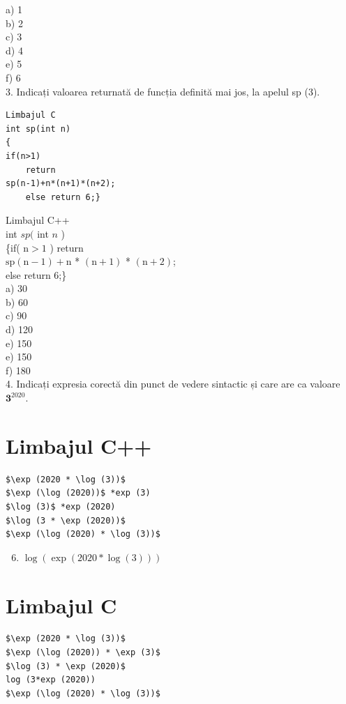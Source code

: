 \documentclass[10pt]{article}
\begin{document}
a) 1\\
b) 2\\
c) 3\\
d) 4\\
e) 5\\
f) 6\\
3. Indicați valoarea returnată de funcția definită mai jos, la apelul sp (3).

\begin{verbatim}
Limbajul C
int sp(int n)
{
if(n>1)
    return
sp(n-1)+n*(n+1)*(n+2);
    else return 6;}
\end{verbatim}

Limbajul C++\\
int $s p($ int $n$ )\\
\{if( $\mathrm{n}>1$ ) return\\
$\mathrm{sp}(\mathrm{n}-1)+\mathrm{n}$ * $(\mathrm{n}+1)$ * $(\mathrm{n}+2)$;\\
else return 6;\}\\
a) 30\\
b) 60\\
c) 90\\
d) 120\\
e) 150\\
e) 150\\
f) 180\\
4. Indicați expresia corectă din punct de vedere sintactic și care are ca valoare $\mathbf{3}^{2020}$.

\section*{Limbajul C++}
\begin{verbatim}
$\exp (2020 * \log (3))$
$\exp (\log (2020))$ *exp (3)
$\log (3)$ *exp (2020)
$\log (3 * \exp (2020))$
$\exp (\log (2020) * \log (3))$
\end{verbatim}

\begin{enumerate}
  \setcounter{enumi}{5}
  \item $\log (\exp (2020 * \log (3)))$
\end{enumerate}

\section*{Limbajul C}
\begin{verbatim}
$\exp (2020 * \log (3))$
$\exp (\log (2020)) * \exp (3)$
$\log (3) * \exp (2020)$
log (3*exp (2020))
$\exp (\log (2020) * \log (3))$
\end{verbatim}
\end{document}
